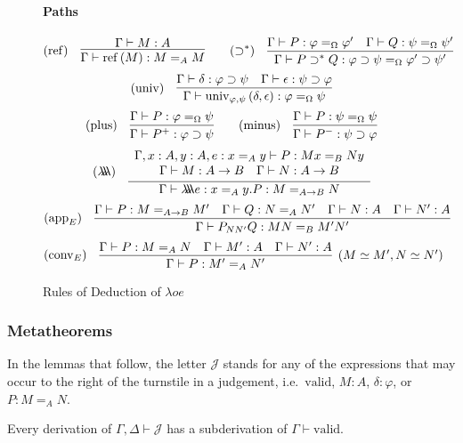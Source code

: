 \documentclass[a4paper,UKenglish]{lipics-v2016}
\newcommand*{\reff}[1]{\ensuremath{\mathrm{ref} \left( {#1} \right)}}
\newcommand*{\univ}[4]{\ensuremath{\mathrm{univ}_{{#1}, {#2}} \left({#3} , {#4} \right)}}
\newcommand*{\triplelambda}{\ensuremath{\lambda \!\! \lambda \!\! \lambda}}
\newcommand*{\vald}{\ensuremath{\vdash \mathrm{valid}}}
\theoremstyle{plain}
\theoremstyle{definition}
\begin{document}
\begin{figure}
\paragraph*{Paths}
$$ (\mathrm{ref}) \quad \vcenter{\infer{\Gamma \vdash \reff{M} : M =_A M}{\Gamma \vdash M : A}}
\qquad
(\supset^*) \quad \vcenter{\infer{\Gamma \vdash P \supset^* Q : \varphi \supset \psi =_\Omega \varphi' \supset \psi'}{\Gamma \vdash P : \varphi =_\Omega \varphi' \quad \Gamma \vdash Q : \psi =_\Omega \psi'}} $$
$$ (\mathrm{univ}) \quad \vcenter{\infer{\Gamma \vdash \univ{\varphi}{\psi}{\delta}{\epsilon} : \varphi =_\Omega \psi}{\Gamma \vdash \delta : \varphi \supset \psi \quad \Gamma \vdash \epsilon : \psi \supset \varphi}} $$
$$ (\mathrm{plus}) \quad \vcenter{\infer{\Gamma \vdash P^+ : \varphi \supset \psi}{\Gamma \vdash P : \varphi =_\Omega \psi}}
\qquad
(\mathrm{minus}) \quad \vcenter{\infer{\Gamma \vdash P^- : \psi \supset \varphi}{\Gamma \vdash P : \psi =_\Omega \psi}} $$
$$ (\triplelambda) \quad \vcenter{\infer{\Gamma \vdash \triplelambda e : x =_A y . P : M =_{A \rightarrow B} N}
  {\begin{array}{c}
     \Gamma, x : A, y : A, e : x =_A y \vdash P : M x =_B N y \\
     \Gamma \vdash M : A \rightarrow B \quad
\Gamma \vdash N : A \rightarrow B
     \end{array}}} $$
$$ (\mathrm{app}_E) \quad \vcenter{\infer{\Gamma \vdash P_{NN'}Q : MN =_B M' N'}{\Gamma \vdash P : M =_{A \rightarrow B} M' \quad \Gamma \vdash Q : N =_A N' \quad \Gamma \vdash N : A \quad \Gamma \vdash N' : A}} $$
$$ (\mathrm{conv}_E) \quad \vcenter{\infer[(M \simeq M', N \simeq N')]{\Gamma \vdash P : M' =_A N'}{\Gamma \vdash P : M =_A N \quad \Gamma \vdash M' : A \quad \Gamma \vdash N' : A}} $$
\caption{Rules of Deduction of $\lambda oe$}
\label{fig:lambdaoe}
\end{figure}

\subsubsection{Metatheorems}

\label{section:meta}

In the lemmas that follow, the letter $\mathcal{J}$ stands for any of the expressions that may occur to the right of the turnstile in a judgement, i.e.~$\mathrm{valid}$, $M : A$, $\delta : \varphi$, or $P : M =_A N$.

\begin{lemma}
Every derivation of $\Gamma, \Delta \vdash \mathcal{J}$ has a subderivation of $\Gamma \vald$.
\end{lemma}
\end{document}
